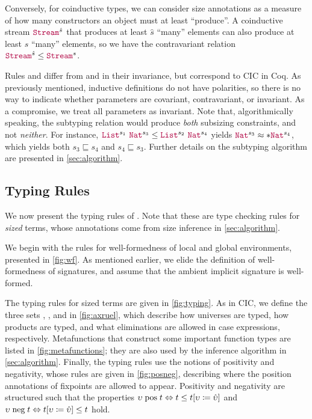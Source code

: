 Conversely, for coinductive types, we can consider size annotations as a measure of how many constructors an object must at least ``produce''. A coinductive stream $\Stream^{\hat{s}}$ that produces at least $\hat{s}$ ``many'' elements can also produce at least $s$ ``many'' elements, so we have the contravariant relation $\Stream^{\hat{s}} \leq \Stream^s$.

Rules  and  differ from \CIChat and \CIChatminus in their invariance, but correspond to CIC in Coq.
As previously mentioned, inductive definitions do not have polarities, so there is no way to indicate whether parameters are covariant, contravariant, or invariant.
As a compromise, we treat all parameters as invariant.
Note that, algorithmically speaking, the subtyping relation would produce \textit{both} subsizing constraints, and not \textit{neither}. For instance, $\List^{s_1} ~ \Nat^{s_3} \leq \List^{s_2} ~ \Nat^{s_4}$ yields $\Nat^{s_3} \conv* \Nat^{s_4}$, which yields both $s_3 \sqsubseteq s_4$ and $s_4 \sqsubseteq s_3$.
Further details on the subtyping algorithm are presented in \autoref{sec:algorithm}.

\subsection{Typing Rules}\label{sec:typing:rules}

We now present the typing rules of \lang.
Note that these are type checking rules for \textit{sized} terms, whose annotations come from size inference in \autoref{sec:algorithm}.



We begin with the rules for well-formedness of local and global environments, presented in \autoref{fig:wf}.
As mentioned earlier, we elide the definition of well-formedness of signatures,
and assume that the ambient implicit signature is well-formed.









The typing rules for sized terms are given in \autoref{fig:typing}. As in CIC, we define the three sets \Axioms, \Rules, and \Elims in \autoref{fig:axruel}, which describe how universes are typed, how products are typed, and what eliminations are allowed in case expressions, respectively.
Metafunctions that construct some important function types are listed in \autoref{fig:metafunctions}; they are also used by the inference algorithm in \autoref{sec:algorithm}.
Finally, the typing rules use the notions of positivity and negativity, whose rules are given in \autoref{fig:posneg}, describing where the position annotations of fixpoints are allowed to appear.
Positivity and negativity are structured such that the properties $\upsilon \mathrel{\text{pos}} t \Leftrightarrow t \leq t [\upsilon \coloneqq \hat{\upsilon}]$ and $\upsilon \mathrel{\text{neg}} t \Leftrightarrow t [\upsilon \coloneqq \hat{\upsilon}] \leq t$ hold.

